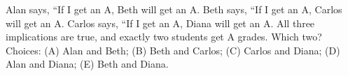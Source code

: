 Alan says, ``If I get an A, Beth will get an A. Beth says, ``If I get an A, Carlos will get an A. Carlos says, ``If I get an A, Diana will get an A. All three implications are true, and exactly two students get A grades. Which two? Choices: (A) Alan and Beth; (B) Beth and Carlos; (C) Carlos and Diana; (D) Alan and Diana; (E) Beth and Diana.
